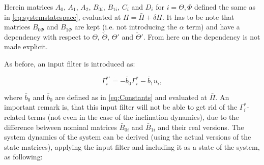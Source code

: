 \documentclass[main.tex]{subfiles}
\begin{document}
Herein matrices $A_0$, $A_1$, $A_2$, $B_{0i}$, $B_{1i}$, $C_i$ and $D_i$ for $i = \Theta, \Phi$ defined the same as in \eqref{eq:systemstatespace}, evaluated at $\Pi = \bar{\Pi} + \delta \Pi$. It has to be note that matrices $B_{0\Phi}$ and $B_{1\Phi}$ are kept (i.e. not introducing the $\alpha$ term) and have a dependency with respect to $\Theta$, $\check{\Theta}$, $\Theta'$ and $\check{\Theta}'$. From here on the dependency is not made explicit. 

As before, an input filter is introduced as:

\begin{equation}
	\Gamma_i^{*'} = -\bar{b}_0\Gamma_i^* - \bar{b}_1 u_i,
\end{equation}

where $\bar{b}_0$ and $\bar{b}_0$ are defined as in \eqref{eq:Constants} and evaluated at  $\bar{\Pi}$. An important remark is, that this input filter will not be able to get rid of the $\Gamma_i^*$-related terms (not even in the case of the inclination dynamics), due to the difference between nominal matrices $\bar{B}_{0i}$ and $\bar{B}_{1i}$ and their real versions. The system dynamics of the system  can be derived (using the actual versions of the state matrices), applying the input filter and including it as a state of the system, as following:
\end{document}
